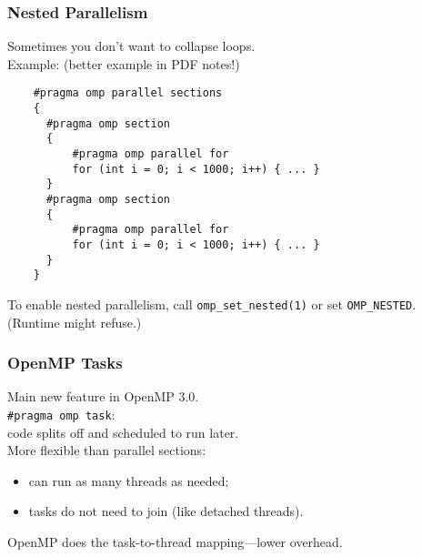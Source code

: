 \documentclass[aspectratio=43]{beamer}
\newenvironment{changemargin}[1]{%
  \begin{list}{}{%
    \setlength{\topsep}{0pt}%
    \setlength{\leftmargin}{#1}%
    \setlength{\rightmargin}{1em}
    \setlength{\listparindent}{\parindent}%
    \setlength{\itemindent}{\parindent}%
    \setlength{\parsep}{\parskip}%
  }%
  \item[]}{\end{list}}
\begin{document}
\begin{frame}[fragile]
  \frametitle{Nested Parallelism}
  \begin{changemargin}{2cm}

  Sometimes you don't want to collapse loops.\\[1em]

  Example: (better example in PDF notes!)\\[1em]

{\small
  \begin{lstlisting}
    #pragma omp parallel sections
    {
      #pragma omp section
      { 
          #pragma omp parallel for
          for (int i = 0; i < 1000; i++) { ... } 
      }
      #pragma omp section
      {
          #pragma omp parallel for
          for (int i = 0; i < 1000; i++) { ... } 
      }
    }
\end{lstlisting}}

  To enable nested parallelism, call \verb+omp_set_nested(1)+ or
  set \verb+OMP_NESTED+. (Runtime might refuse.)\\[1em]

  
  \end{changemargin}


\end{frame}

\begin{frame}[fragile]
  \frametitle{OpenMP Tasks}
  \begin{changemargin}{2cm}

  Main new feature in OpenMP 3.0.\\[1em]

  \verb+#pragma omp task+:\\ \qquad code splits off and scheduled to run later.\\[1em]

  More flexible than parallel sections: 
  \begin{itemize}
   \item can run as many threads as needed;
   \item tasks do not need to join (like detached threads).
  \end{itemize}
  OpenMP does the task-to-thread mapping---lower overhead.

  \end{changemargin}


\end{frame}
\end{document}
